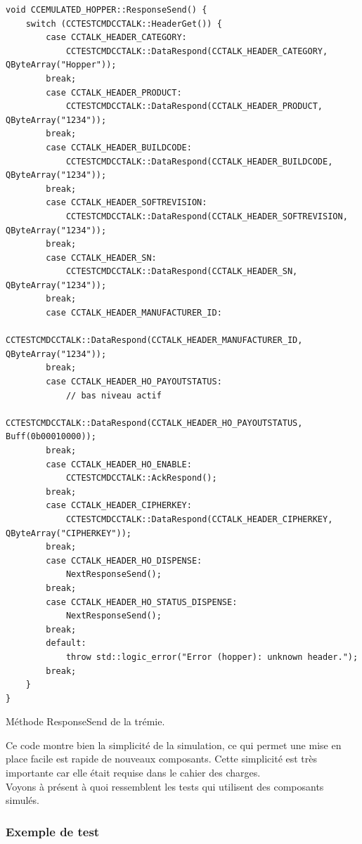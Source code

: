 \documentclass[a4paper]{article}
\begin{document}
\pagebreak
\begin{listing}[ht!]
\begin{verbatim}
void CCEMULATED_HOPPER::ResponseSend() {
    switch (CCTESTCMDCCTALK::HeaderGet()) {
        case CCTALK_HEADER_CATEGORY:
            CCTESTCMDCCTALK::DataRespond(CCTALK_HEADER_CATEGORY, QByteArray("Hopper"));
        break;
        case CCTALK_HEADER_PRODUCT:
            CCTESTCMDCCTALK::DataRespond(CCTALK_HEADER_PRODUCT, QByteArray("1234"));
        break;
        case CCTALK_HEADER_BUILDCODE:
            CCTESTCMDCCTALK::DataRespond(CCTALK_HEADER_BUILDCODE, QByteArray("1234"));
        break;
        case CCTALK_HEADER_SOFTREVISION:
            CCTESTCMDCCTALK::DataRespond(CCTALK_HEADER_SOFTREVISION, QByteArray("1234"));
        break;
        case CCTALK_HEADER_SN:
            CCTESTCMDCCTALK::DataRespond(CCTALK_HEADER_SN, QByteArray("1234"));
        break;
        case CCTALK_HEADER_MANUFACTURER_ID:
            CCTESTCMDCCTALK::DataRespond(CCTALK_HEADER_MANUFACTURER_ID, QByteArray("1234"));
        break;
        case CCTALK_HEADER_HO_PAYOUTSTATUS:
            // bas niveau actif
            CCTESTCMDCCTALK::DataRespond(CCTALK_HEADER_HO_PAYOUTSTATUS, Buff(0b00010000));
        break;
        case CCTALK_HEADER_HO_ENABLE:
            CCTESTCMDCCTALK::AckRespond();
        break;
        case CCTALK_HEADER_CIPHERKEY:
            CCTESTCMDCCTALK::DataRespond(CCTALK_HEADER_CIPHERKEY, QByteArray("CIPHERKEY"));
        break;
        case CCTALK_HEADER_HO_DISPENSE:
            NextResponseSend();
        break;
        case CCTALK_HEADER_HO_STATUS_DISPENSE:
            NextResponseSend();
        break;
        default:
            throw std::logic_error("Error (hopper): unknown header.");
        break;
    }
}
\end{verbatim}
\caption{Méthode ResponseSend de la trémie.}
\label{respsendhopper}
\end{listing}

Ce code montre bien la simplicité de la simulation, ce qui permet une mise en
place facile est rapide de nouveaux composants. Cette simplicité est très
importante car elle était requise dans le cahier des charges.\\

Voyons à présent à quoi ressemblent les tests qui utilisent des composants
simulés.

\subsubsection{Exemple de test}
\end{document}
